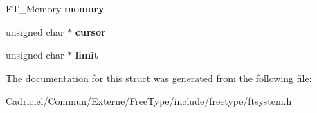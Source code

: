 \begin{DoxyCompactItemize}
\item 
F\+T\+\_\+\+Memory {\bfseries memory}\hypertarget{struct_f_t___stream_rec___a51e2be0d80d70b532aae3face5461e7e}{}\label{struct_f_t___stream_rec___a51e2be0d80d70b532aae3face5461e7e}

\item 
unsigned char $\ast$ {\bfseries cursor}\hypertarget{struct_f_t___stream_rec___ab7dbbad87d8b6d0178771a06e1ce8b4d}{}\label{struct_f_t___stream_rec___ab7dbbad87d8b6d0178771a06e1ce8b4d}

\item 
unsigned char $\ast$ {\bfseries limit}\hypertarget{struct_f_t___stream_rec___aff006e6ee3bbc2741a2c4ae79b1bad3a}{}\label{struct_f_t___stream_rec___aff006e6ee3bbc2741a2c4ae79b1bad3a}

\end{DoxyCompactItemize}


The documentation for this struct was generated from the following file\+:\begin{DoxyCompactItemize}
\item 
Cadriciel/\+Commun/\+Externe/\+Free\+Type/include/freetype/ftsystem.\+h\end{DoxyCompactItemize}
